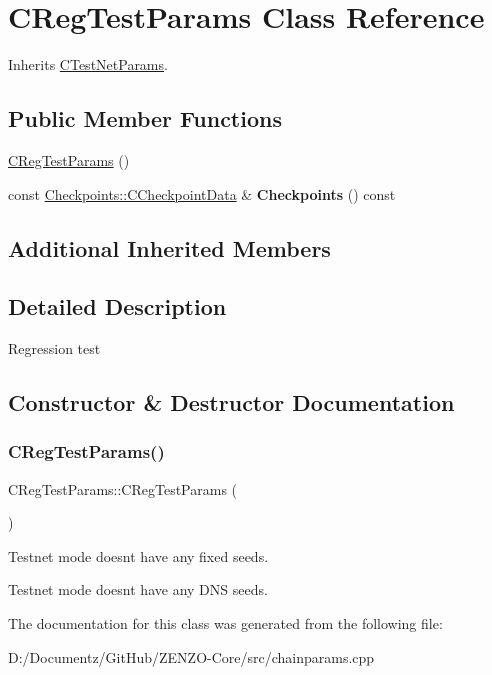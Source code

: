 \hypertarget{class_c_reg_test_params}{}\section{C\+Reg\+Test\+Params Class Reference}
\label{class_c_reg_test_params}


Inherits \mbox{\hyperlink{class_c_test_net_params}{C\+Test\+Net\+Params}}.

\subsection*{Public Member Functions}
\begin{DoxyCompactItemize}
\item 
\mbox{\hyperlink{class_c_reg_test_params_aceca5a50765323f150ac608ca43db4fd}{C\+Reg\+Test\+Params}} ()
\item 
\mbox{\label{class_c_reg_test_params_a35c41705020a5f5a4cf461ce00b954f0}} 
const \mbox{\hyperlink{struct_checkpoints_1_1_c_checkpoint_data}{Checkpoints\+::\+C\+Checkpoint\+Data}} \& {\bfseries Checkpoints} () const
\end{DoxyCompactItemize}
\subsection*{Additional Inherited Members}


\subsection{Detailed Description}
Regression test 

\subsection{Constructor \& Destructor Documentation}
\mbox{\label{class_c_reg_test_params_aceca5a50765323f150ac608ca43db4fd}} 
\subsubsection{\texorpdfstring{CRegTestParams()}{CRegTestParams()}}
{\footnotesize\ttfamily C\+Reg\+Test\+Params\+::\+C\+Reg\+Test\+Params (\begin{DoxyParamCaption}{ }\end{DoxyParamCaption})\hspace{0.3cm}{\ttfamily [inline]}}

Testnet mode doesn\textquotesingle{}t have any fixed seeds.

Testnet mode doesn\textquotesingle{}t have any D\+NS seeds. 

The documentation for this class was generated from the following file\+:\begin{DoxyCompactItemize}
\item 
D\+:/\+Documentz/\+Git\+Hub/\+Z\+E\+N\+Z\+O-\/\+Core/src/chainparams.\+cpp\end{DoxyCompactItemize}
